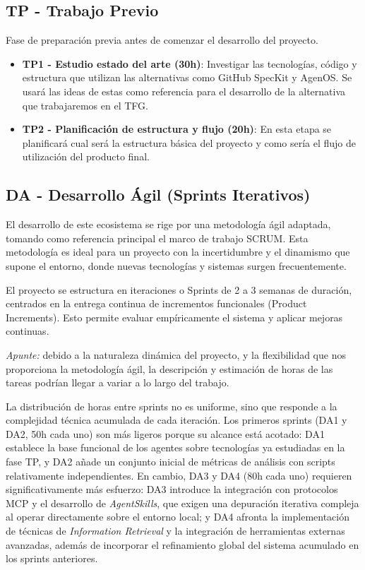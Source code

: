 \documentclass[11pt, letterpaper]{article}
\begin{document}
\subsection{TP - Trabajo Previo}
Fase de preparación previa antes de comenzar el desarrollo del proyecto.
\begin{itemize}
    \item \textbf{TP1 - Estudio estado del arte (30h)}: Investigar las tecnologías, código y estructura que utilizan las alternativas como GitHub SpecKit y AgenOS. Se usará las ideas de estas como referencia para el desarrollo de la alternativa que trabajaremos en el TFG.
    \item \textbf{TP2 - Planificación de estructura y flujo (20h)}: En esta etapa se planificará cual será la estructura básica del proyecto y como sería el flujo de utilización del producto final. 
\end{itemize}

\subsection{DA - Desarrollo Ágil (Sprints Iterativos)}

El desarrollo de este ecosistema se rige por una metodología ágil adaptada, tomando como referencia principal el marco de trabajo SCRUM. Esta metodología es ideal para un proyecto con la incertidumbre y el dinamismo que supone el entorno, donde nuevas tecnologías y sistemas surgen frecuentemente. 

El proyecto se estructura en iteraciones o Sprints de 2 a 3 semanas de duración, centrados en la entrega continua de incrementos funcionales (Product Increments). Esto permite evaluar empíricamente el sistema y aplicar mejoras continuas.

\textit{Apunte:} debido a la naturaleza dinámica del proyecto, y la flexibilidad que nos proporciona la metodología ágil, la descripción y estimación de horas de las tareas podrían llegar a variar a lo largo del trabajo.

La distribución de horas entre sprints no es uniforme, sino que responde a la complejidad técnica acumulada de cada iteración. Los primeros sprints (DA1 y DA2, 50h cada uno) son más ligeros porque su alcance está acotado: DA1 establece la base funcional de los agentes sobre tecnologías ya estudiadas en la fase TP, y DA2 añade un conjunto inicial de métricas de análisis con scripts relativamente independientes. En cambio, DA3 y DA4 (80h cada uno) requieren significativamente más esfuerzo: DA3 introduce la integración con protocolos MCP y el desarrollo de \textit{AgentSkills}, que exigen una depuración iterativa compleja al operar directamente sobre el entorno local; y DA4 afronta la implementación de técnicas de \textit{Information Retrieval} y la integración de herramientas externas avanzadas, además de incorporar el refinamiento global del sistema acumulado en los sprints anteriores.
\end{document}
